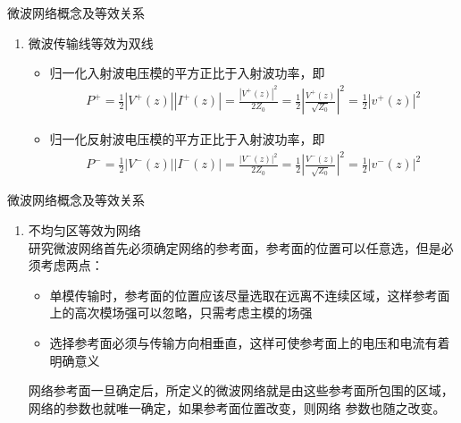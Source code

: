 \begin{frame}{微波网络概念及等效关系}
    \begin{enumerate}
        \item 微波传输线等效为双线
              \begin{itemize}
                  \item 归一化入射波电压模的平方正比于入射波功率，即
                        \begin{align*}
                            P^+=\frac{1}{2}|V^+(z)||I^+(z)|=\frac{|V^+(z)|^2}{2Z_0}=\frac{1}{2}\left\lvert\frac{V^+(z)}{\sqrt{Z_0}}\right\rvert^2=\frac{1}{2}|v^+(z)|^2
                        \end{align*}
                  \item 归一化反射波电压模的平方正比于入射波功率，即
                        \begin{align*}
                            P^-=\frac{1}{2}|V^-(z)||I^-(z)|=\frac{|V^-(z)|^2}{2Z_0}=\frac{1}{2}\left\lvert\frac{V^-(z)}{\sqrt{Z_0}}\right\rvert^2=\frac{1}{2}|v^-(z)|^2
                        \end{align*}
              \end{itemize}
              \saveenum
    \end{enumerate}
\end{frame}

\begin{frame}{微波网络概念及等效关系}
    \begin{enumerate}
        \resume
        \item 不均匀区等效为网络\\
              研究微波网络首先必须确定网络的参考面，参考面的位置可以任意选，但是必须考虑两点：
              \begin{itemize}
                  \item 单模传输时，参考面的位置应该尽量选取在远离不连续区域，这样参考面上的高次模场强可以忽略，只需考虑主模的场强
                  \item 选择参考面必须与传输方向相垂直，这样可使参考面上的电压和电流有着明确意义
              \end{itemize}
              网络参考面一旦确定后，所定义的微波网络就是由这些参考面所包围的区域，网络的参数也就唯一确定，如果参考面位置改变，则网络
              参数也随之改变。
    \end{enumerate}
\end{frame}

